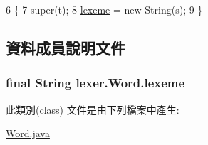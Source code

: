 \begin{DoxyCode}
6                                  \{
7         super(t);
8         \hyperlink{classlexer_1_1_word_a9e398a2a4009ed6a16bdee2d90a34dcf}{lexeme} = \textcolor{keyword}{new} String(s);
9     \}
\end{DoxyCode}


\subsection{資料成員說明文件}
\subsubsection[{\texorpdfstring{lexeme}{lexeme}}]{\setlength{\rightskip}{0pt plus 5cm}final String lexer.\+Word.\+lexeme}\hypertarget{classlexer_1_1_word_a9e398a2a4009ed6a16bdee2d90a34dcf}{}\label{classlexer_1_1_word_a9e398a2a4009ed6a16bdee2d90a34dcf}


此類別(class) 文件是由下列檔案中產生\+:\begin{DoxyCompactItemize}
\item 
\hyperlink{_word_8java}{Word.\+java}\end{DoxyCompactItemize}

